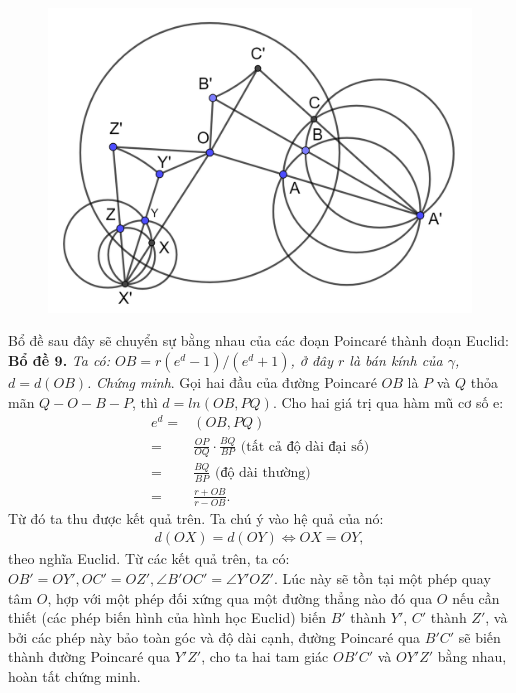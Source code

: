 \begin{multicols}{2}
\begin{figure}[H]
		\includegraphics[width= 1\linewidth]{thcgc}
		\vspace*{-15pt}
	\end{figure}
	Bổ đề sau đây sẽ chuyển sự bằng nhau của các đoạn Poincar\'e thành đoạn Euclid:
	\vskip 0.1cm
	\textbf{\color{lichsutoanhoc}Bổ đề $\pmb9$.} \textit{Ta có: $OB =  r(e^d -1)/(e^d+1)$, ở đây $r$ là bán kính của $\gamma$, $d = d(OB)$.}
	\vskip 0.1cm
	\textit{Chứng minh}. Gọi hai đầu của đường Poincar\'e  $OB$ là $P$ và $Q$ thỏa mãn 
	$Q - O - B - P$, thì $d = ln(OB, PQ)$.
	\vskip 0.1cm
	Cho hai giá trị qua hàm mũ cơ số e:
	\begin{align*}
		e^d = &(OB, PQ) \\
		=& \frac{OP}{OQ} \cdot \frac{BQ}{BP} \text{ (tất cả độ dài đại số)} \\
		= &\frac{BQ}{BP} \text{ (độ dài thường)}\\
		 = & \frac{r+OB}{r-OB}.
	\end{align*} 
	Từ đó ta thu được kết quả trên.
	Ta chú ý vào hệ quả của nó: 
	\begin{align*}
		d(OX) = d(OY) 
		\Longleftrightarrow OX = OY,
	\end{align*}
	theo nghĩa Euclid.
	\vskip 0.1cm
	Từ các kết quả trên, ta có: $OB' = OY', OC' = OZ', \angle B'OC' = \angle Y'OZ'.$
	\vskip 0.1cm
	Lúc này sẽ tồn tại một phép quay tâm $O$, hợp với một phép đối xứng qua một đường thẳng nào đó qua $O$ nếu cần thiết (các phép biến hình của hình học Euclid) biến $B'$ thành $Y'$, $C'$ thành $Z'$, và bởi các phép này bảo toàn góc và độ dài cạnh, đường Poincar\'e qua $B'C'$ sẽ biến thành đường Poincar\'e qua $Y'Z'$, cho ta hai tam giác $OB'C'$ và $OY'Z'$ bằng nhau, hoàn tất chứng minh.

\end{multicols}
